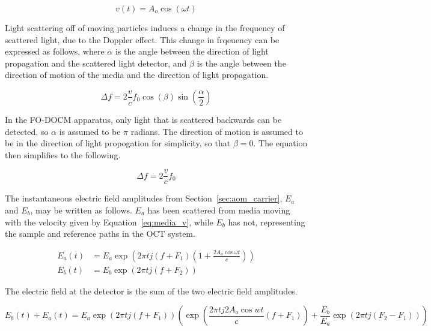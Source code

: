 \begin{equation} \label{eq:media_v}
v(t) = A_o \cos{(\omega t)}
\end{equation}

Light scattering off of moving particles induces a change in the frequency of scattered light, due to the Doppler effect. This change in frqeuency can be expressed as follows, where $\alpha$ is the angle between the direction of light propagation and the scattered light detector, and $\beta$ is the angle between the direction of motion of the media and the direction of light propagation. \cite{hurst}


\begin{equation} \Delta f = 2 \frac{v}{c} f_0 \cos{(\beta)} \sin{(\frac{\alpha}{2})} \end{equation}

In the FO-DOCM apparatus, only light that is scattered backwards can be detected, so $\alpha$ is assumed to be $\pi$ radians. The direction of motion is assumed to be in the direction of light propogation for simplicity, so that $\beta = 0$. The equation then simplifies to the following.

\begin{equation} \Delta f = 2 \frac{v}{c} f_0 \end{equation}

The instantaneous electric field amplitudes from Section~\ref{sec:aom_carrier}, $E_a$ and $E_b$, may be written as follows. $E_a$ has been scattered from media moving with the velocity given by Equation~\ref{eq:media_v}, while $E_b$ has not, representing the sample and reference paths in the OCT system.

\begin{align}
E_a(t) & = E_a \exp{(2 \pi t j (f + F_1)(1 + \frac{2 A_o\cos{\omega t}}{c}))} \\
E_b(t) & = E_b \exp{(2 \pi t j (f + F_2))}
\end{align}

The electric field at the detector is the sum of the two electric field amplitudes.

\begin{dmath}
E_b(t) + E_a(t) = E_a \exp{(2 \pi t j (f + F_1))}\left(\exp{\left(\frac{2 \pi t j 2 A_o \cos{wt}}{c}(f + F_1)\right)} + \frac{E_b}{E_a} \exp{(2 \pi t j (F_2 - F_1))}\right)
\end{dmath}

